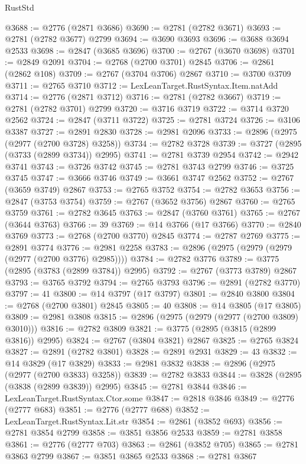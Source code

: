 \begin{lexlean}{RustStd}
\begin{coremodule}
@3688 := @2776 (@2871 @3686)
@3690 := @2781 (@2782 @3671)
@3693 := @2781 (@2782 @3677) @2799
@3694 := @3690 @3693
@3696 := @3688 @3694 @2533
@3698 := @2847 (@3685 @3696)
@3700 := @2767 (@3670 @3698)
@3701 := @2849 @2091
@3704 := @2768 (@2700 @3701) @2845
@3706 := @2861 (@2862 @108)
@3709 := @2767 (@3704 @3706) @2867
@3710 := @3700 @3709
@3711 := @2765 @3710
@3712 := LexLeanTarget.RustSyntax.Item.natAdd
@3714 := @2776 (@2871 @3712)
@3716 := @2781 (@2782 @3667)
@3719 := @2781 (@2782 @3701) @2799
@3720 := @3716 @3719
@3722 := @3714 @3720 @2562
@3724 := @2847 (@3711 @3722)
@3725 := @2781 @3724
@3726 := @3106 @3387
@3727 := @2891 @2830
@3728 := @2981 @2096
@3733 := @2896 (@2975 (@2977 (@2700 @3728) @3258))
@3734 := @2782 @3728
@3739 := @3727 (@2895 (@3733 (@2899 @3734)) @2995)
@3741 := @2781 @3739 @2954
@3742 := @2942 @3741
@3743 := @3726 @3742
@3745 := @2781 @3743 @2799
@3746 := @3725 @3745
@3747 := @3666 @3746
@3749 := @3661 @3747 @2562
@3752 := @2767 (@3659 @3749) @2867
@3753 := @2765 @3752
@3754 := @2782 @3653
@3756 := @2847 (@3753 @3754)
@3759 := @2767 (@3652 @3756) @2867
@3760 := @2765 @3759
@3761 := @2782 @3645
@3763 := @2847 (@3760 @3761)
@3765 := @2767 (@3644 @3763)
@3766 := 39
@3769 := @14 @3766 (@17 @3766)
@3770 := @2840 @3769
@3773 := @2768 (@2700 @3770) @2845
@3774 := @2787 @2769
@3775 := @2891 @3774
@3776 := @2981 @2258
@3783 := @2896 (@2975 (@2979 (@2979 (@2977 (@2700 @3776) @2985))))
@3784 := @2782 @3776
@3789 := @3775 (@2895 (@3783 (@2899 @3784)) @2995)
@3792 := @2767 (@3773 @3789) @2867
@3793 := @3765 @3792
@3794 := @2765 @3793
@3796 := @2891 (@2782 @3770)
@3797 := 41
@3800 := @14 @3797 (@17 @3797)
@3801 := @2840 @3800
@3804 := @2768 (@2700 @3801) @2845
@3805 := 40
@3808 := @14 @3805 (@17 @3805)
@3809 := @2981 @3808
@3815 := @2896 (@2975 (@2979 (@2977 (@2700 @3809) @3010)))
@3816 := @2782 @3809
@3821 := @3775 (@2895 (@3815 (@2899 @3816)) @2995)
@3824 := @2767 (@3804 @3821) @2867
@3825 := @2765 @3824
@3827 := @2891 (@2782 @3801)
@3828 := @2891 @2931
@3829 := 43
@3832 := @14 @3829 (@17 @3829)
@3833 := @2981 @3832
@3838 := @2896 (@2975 (@2977 (@2700 @3833) @3258))
@3839 := @2782 @3833
@3844 := @3828 (@2895 (@3838 (@2899 @3839)) @2995)
@3845 := @2781 @3844
@3846 := LexLeanTarget.RustSyntax.Ctor.some
@3847 := @2818 @3846
@3849 := @2776 (@2777 @683)
@3851 := @2776 (@2777 @688)
@3852 := LexLeanTarget.RustSyntax.Lit.str
@3854 := @2861 (@3852 @693)
@3856 := @2781 @3854 @2799
@3858 := @3851 @3856 @2533
@3859 := @2781 @3858
@3861 := @2776 (@2777 @703)
@3863 := @2861 (@3852 @705)
@3865 := @2781 @3863 @2799
@3867 := @3851 @3865 @2533
@3868 := @2781 @3867

\end{coremodule}
\end{lexlean}
